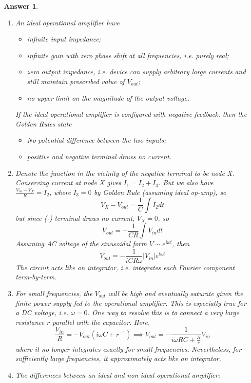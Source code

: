 \documentclass[a4paper]{article}
\newtheorem{ans}{Answer}[subsection]
\theoremstyle{new}
\begin{document}
\begin{ans}\leavevmode
\begin{enumerate}[label=(\alph*)]
\item An ideal operational amplifier have
\begin{itemize}
    \item infinite input impedance;
    \item infinite gain with zero phase shift at all frequencies, i.e. purely real;
    \item zero output impedance, i.e. device can supply arbitrary large currents and still maintain prescribed value of $V_{out}$;
    \item no upper limit on the magnitude of the output voltage.
\end{itemize}
If the ideal operational amplifier is configured with negative feedback, then the Golden Rules state
\begin{itemize}
    \item No potential difference between the two inputs;
    \item positive and negative terminal draws no current.
\end{itemize}
\item Denote the junction in the vicinity of the negative terminal to be node X. Conserving current at node X gives $I_1=I_2+I_3$. But we also have $\frac{V_{in}-V_X}{R}=I_2$, where $I_3=0$ by Golden Rule (assuming ideal op-amp), so
$$V_X-V_{out}=\frac{1}{C}\int I_2dt$$
but since (-) terminal draws no current, $V_X=0$, so 
$$V_{out}=-\frac{1}{CR}\int V_{in}dt$$
Assuming AC voltage of the sinusoidal form $V\sim e^{i\omega t}$, then
$$V_{out}=-\frac{1}{iCR\omega}|V_{in}|e^{i\omega t}$$
The circuit acts like an integrator, i.e. integrates each Fourier component term-by-term.
\item For small frequencies, the $V_{out}$ will be high and eventually saturate given the finite power supply fed to the operational amplifier. This is especially true for a DC voltage, i.e. $\omega=0$. One way to resolve this is to connect a very large resistance $r$ parallel with the capacitor. Here,
$$\frac{V_{in}}{R}=-V_{out}(i\omega C+r^{-1})\implies V_{out}=-\frac{1}{i\omega RC+\frac{R}{r}}V_{in}$$
where it no longer integrates exactly for small frequencies. Nevertheless, for sufficiently large frequencies, it approximately acts like an integrator.
\item The differences between an ideal and non-ideal operational amplifier:
\begin{itemize}

\end{itemize}
\end{enumerate}
\end{ans}
\end{document}
